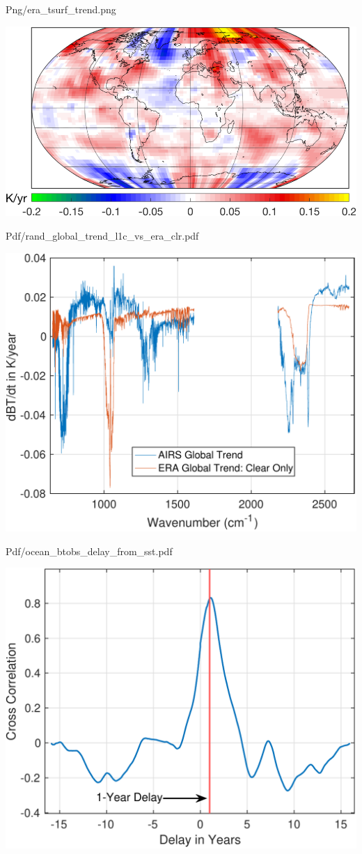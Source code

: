 \documentclass[presentation]{beamer}
\begin{document}
\begin{frame}[label={sec:org71114c6}]{Png/era\_tsurf\_trend.png}
\begin{center}
\includegraphics[width=0.7\linewidth]{./Figs/Png/era_tsurf_trend.png}
\end{center}
\end{frame}



\begin{frame}[label={sec:org5a0dcb4}]{Pdf/rand\_global\_trend\_l1c\_vs\_era\_clr.pdf}
\begin{center}
\includegraphics[width=0.7\linewidth]{./Figs/Pdf/rand_global_trend_l1c_vs_era_clr.pdf}
\end{center}
\end{frame}


\begin{frame}[label={sec:org4e3a367}]{Pdf/ocean\_btobs\_delay\_from\_sst.pdf}
\begin{center}
\includegraphics[width=0.7\linewidth]{./Figs/Pdf/ocean_btobs_delay_from_sst.pdf}
\end{center}
\end{frame}
\end{document}
